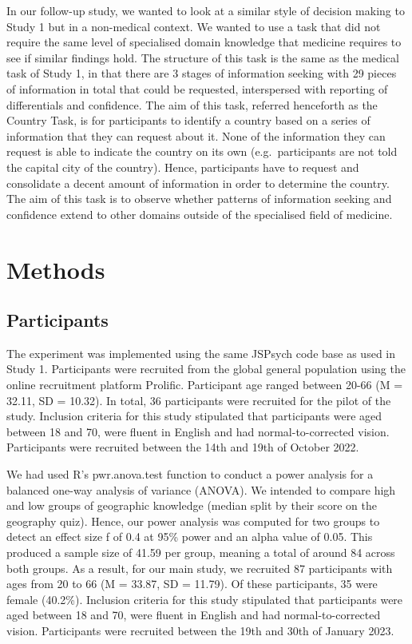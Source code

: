 \documentclass[a4paper, nobind]{templates/ociamthesis}
\begin{document}
\adjustmtc
{}

In our follow-up study, we wanted to look at a similar style of decision making to Study 1 but in a non-medical context. We wanted to use a task that did not require the same level of specialised domain knowledge that medicine requires to see if similar findings hold. The structure of this task is the same as the medical task of Study 1, in that there are 3 stages of information seeking with 29 pieces of information in total that could be requested, interspersed with reporting of differentials and confidence. The aim of this task, referred henceforth as the Country Task, is for participants to identify a country based on a series of information that they can request about it. None of the information they can request is able to indicate the country on its own (e.g.~participants are not told the capital city of the country). Hence, participants have to request and consolidate a decent amount of information in order to determine the country. The aim of this task is to observe whether patterns of information seeking and confidence extend to other domains outside of the specialised field of medicine.

\hypertarget{methods-1}{%
\section*{Methods}\label{methods-1}}

\hypertarget{participants-1}{%
\subsection*{Participants}\label{participants-1}}

The experiment was implemented using the same JSPsych code base as used in Study 1. Participants were recruited from the global general population using the online recruitment platform Prolific. Participant age ranged between 20-66 (M = 32.11, SD = 10.32). In total, 36 participants were recruited for the pilot of the study. Inclusion criteria for this study stipulated that participants were aged between 18 and 70, were fluent in English and had normal-to-corrected vision. Participants were recruited between the 14th and 19th of October 2022.

We had used R's pwr.anova.test function to conduct a power analysis for a balanced one-way analysis of variance (ANOVA). We intended to compare high and low groups of geographic knowledge (median split by their score on the geography quiz). Hence, our power analysis was computed for two groups to detect an effect size f of 0.4 at 95\% power and an alpha value of 0.05. This produced a sample size of 41.59 per group, meaning a total of around 84 across both groups. As a result, for our main study, we recruited 87 participants with ages from 20 to 66 (M = 33.87, SD = 11.79). Of these participants, 35 were female (40.2\%). Inclusion criteria for this study stipulated that participants were aged between 18 and 70, were fluent in English and had normal-to-corrected vision. Participants were recruited between the 19th and 30th of January 2023.
\end{document}
